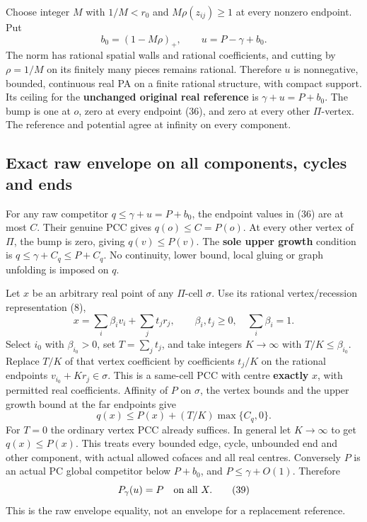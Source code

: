 \documentclass[
  11pt,
]{article}
\begin{document}
Choose integer \(M\) with \(1/M<r_0\) and \(M\rho(z_{ij})\geq1\) at
every nonzero endpoint. Put \[
             b_0=(1-M\rho)_+,\qquad u=P-\gamma+b_0.           \tag{37}
\] The norm has rational spatial walls and rational coefficients, and
cutting by \(\rho=1/M\) on its finitely many pieces remains rational.
Therefore \(u\) is nonnegative, bounded, continuous real PA on a finite
rational structure, with compact support. Its ceiling for the
\textbf{unchanged original real reference} is \(\gamma+u=P+b_0\). The
bump is one at \(o\), zero at every endpoint (36), and zero at every
other \(\Pi\)-vertex. The reference and potential agree at infinity on
every component.

\subsection{Exact raw envelope on all components, cycles and
ends}\label{exact-raw-envelope-on-all-components-cycles-and-ends}

For any raw competitor \(q\leq\gamma+u=P+b_0\), the endpoint values in
(36) are at most \(C\). Their genuine PCC gives \(q(o)\leq C=P(o)\). At
every other vertex of \(\Pi\), the bump is zero, giving
\(q(v)\leq P(v)\). The \textbf{sole upper growth} condition is
\(q\leq\gamma+C_q\leq P+C_q\). No continuity, lower bound, local gluing
or graph unfolding is imposed on \(q\).

Let \(x\) be an arbitrary real point of any \(\Pi\)-cell \(\sigma\). Use
its rational vertex/recession representation (8), \[
 x=\sum_i\beta_iv_i+\sum_jt_jr_j,\qquad
 \beta_i,t_j\geq0,\quad\sum_i\beta_i=1.
\] Select \(i_0\) with \(\beta_{i_0}>0\), set \(T=\sum_jt_j\), and take
integers \(K\to\infty\) with \(T/K\leq\beta_{i_0}\). Replace \(T/K\) of
that vertex coefficient by coefficients \(t_j/K\) on the rational
endpoints \(v_{i_0}+Kr_j\in\sigma\). This is a same-cell PCC with centre
\textbf{exactly} \(x\), with permitted real coefficients. Affinity of
\(P\) on \(\sigma\), the vertex bounds and the upper growth bound at the
far endpoints give \[
             q(x)\leq P(x)+(T/K)\max\{C_q,0\}.               \tag{38}
\] For \(T=0\) the ordinary vertex PCC already suffices. In general let
\(K\to\infty\) to get \(q(x)\leq P(x)\). This treats every bounded edge,
cycle, unbounded end and other component, with actual allowed cofaces
and all real centres. Conversely \(P\) is an actual PC global competitor
below \(P+b_0\), and \(P\leq\gamma+O(1)\). Therefore \[
                             P_\gamma(u)=P\quad\hbox{on all }X.       \tag{39}
\] This is the raw envelope equality, not an envelope for a replacement
reference.
\end{document}
